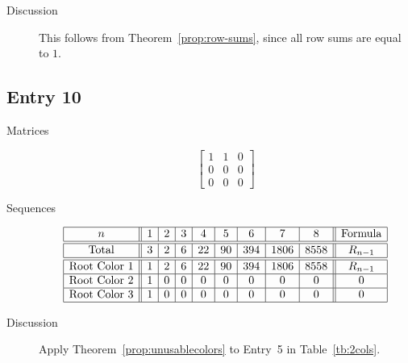 \documentclass[12pt]{amsart}
\begin{document}
\begin{description}
    
    \item[Discussion] This follows from Theorem~\ref{prop:row-sums}, since all row sums are equal to $1$.    
\end{description}


\subsection*{Entry 10}
\begin{description}
    \item[Matrices]
    
    \[\begin{bmatrix}
1 & 1 & 0 \\
0 & 0 & 0 \\
0 & 0 & 0
\end{bmatrix}\]
    \item[Sequences]\hspace*{\fill}\vspace{-0.5cm}
    \begin{center}
        \[
        \begin{array}{|c||c|c|c|c|c|c|c|c||c|}\hline
           n  & 1 & 2 & 3 & 4 & 5 & 6 & 7 & 8  & \text{Formula}\\\hline\hline
           \text{Total}  & 3 & 2 & 6 & 22 & 90 & 394 & 1806 & 8558 & R_{n-1}\\\hline\hline
           \text{Root Color }1 & 1 & 2 & 6 & 22 & 90 & 394 & 1806 & 8558 & R_{n-1}\\\hline
           \text{Root Color }2 & 1 & 0 & 0 & 0 & 0 & 0 & 0 & 0 & 0\\\hline
           \text{Root Color }3 & 1 & 0 & 0 & 0 & 0 & 0 & 0 & 0 & 0\\\hline
        \end{array}
        \]
    \end{center}
    

    \item[Discussion]
    Apply Theorem~\ref{prop:unusablecolors} to Entry~5 in Table~\ref{tb:2cols}.
\end{description}
\end{document}

